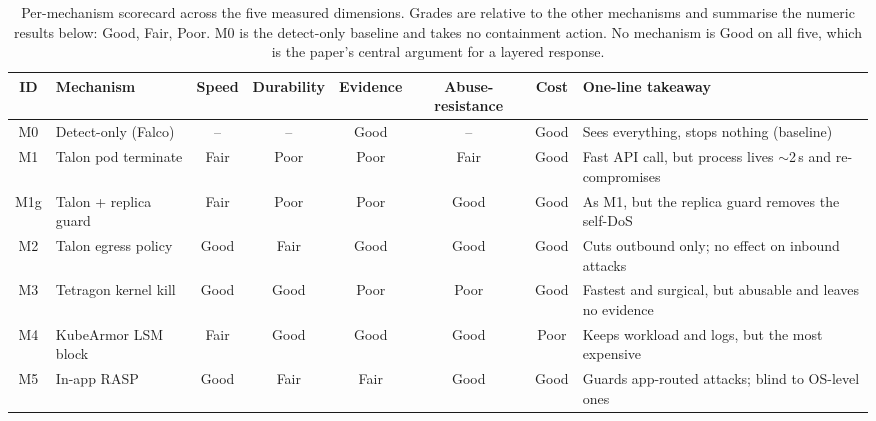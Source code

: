 \documentclass[10pt,conference]{IEEEtran}
\begin{document}
\begin{table}[t]
\caption{Per-mechanism scorecard across the five measured dimensions. Grades are relative to the other mechanisms and summarise the numeric results below: Good, Fair, Poor. M0 is the detect-only baseline and takes no containment action. No mechanism is Good on all five, which is the paper's central argument for a layered response.}
\label{tab:score}
\centering
\setlength{\tabcolsep}{4.5pt}
\begin{tabular}{clcccccl}
\toprule
ID & Mechanism & Speed & Durability & Evidence & Abuse-resistance & Cost & One-line takeaway\\
\midrule
M0  & Detect-only (Falco)   & --   & --   & Good & --   & Good & Sees everything, stops nothing (baseline)\\
M1  & Talon pod terminate   & Fair & Poor & Poor & Fair & Good & Fast API call, but process lives $\sim$2\,s and re-compromises\\
M1g & Talon + replica guard & Fair & Poor & Poor & Good & Good & As M1, but the replica guard removes the self-DoS\\
M2  & Talon egress policy   & Good & Fair & Good & Good & Good & Cuts outbound only; no effect on inbound attacks\\
M3  & Tetragon kernel kill  & Good & Good & Poor & Poor & Good & Fastest and surgical, but abusable and leaves no evidence\\
M4  & KubeArmor LSM block   & Fair & Good & Good & Good & Poor & Keeps workload and logs, but the most expensive\\
M5  & In-app RASP           & Good & Fair & Fair & Good & Good & Guards app-routed attacks; blind to OS-level ones\\
\bottomrule
\end{tabular}
\end{table}
\end{document}
